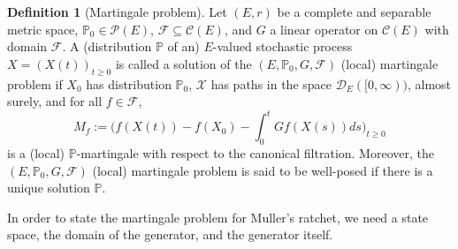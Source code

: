 \documentclass{imsart}
\theoremstyle{plain}
\theoremstyle{definition}
\newtheorem{definition}[theorem]{Definition}
\begin{document}
\begin{definition}[Martingale problem]
Let \label{def:mp} $(E,r)$ be a complete and separable metric space, $\mathbb P_0 \in\mathcal P(E)$, $\mathcal F \subseteq \mathcal C(E)$, and $G$ a linear operator on  ${\mathcal C}(E)$ with domain $\mathcal F$. A (distribution $\mathbb P$ of an) $E$-valued stochastic process $X=(X(t))_{t\geq 0}$ is called a solution of the $(E, \mathbb P_0, G,\mathcal F)$ (local) martingale problem if $X_0$ has distribution $\mathbb P_0$, $\mathcal X$ has paths in the space ${\mathcal D}_{E}([0,\infty))$, almost surely, and for all $f\in\mathcal F$,
\begin{equation}\label{13def}
M_f := \Big(f(X(t))-f(X_0) - \int_0^t G f(X(s)) ds \Big)_{t\geq 0}
\end{equation}
is a (local) $\mathbb{P}$-martingale with respect to the canonical filtration. Moreover, the $(E, \mathbb P_0, G, \mathcal F)$ (local) martingale problem is said to be well-posed if there is a unique solution $\mathbb{P}.$
\end{definition}

\noindent
In order to state the martingale problem for Muller's ratchet, we need a state space, the domain of the generator, and the generator itself.
\end{document}
